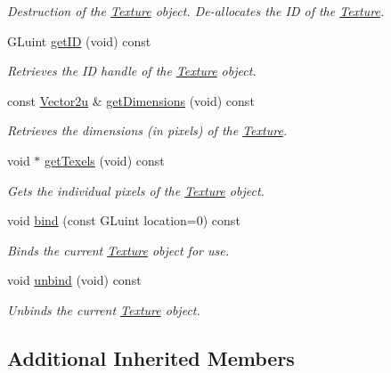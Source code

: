 \begin{DoxyCompactItemize}
\begin{DoxyCompactList}\small\item\em Destruction of the \hyperlink{classsparky_1_1_texture}{Texture} object. De-\/allocates the ID of the \hyperlink{classsparky_1_1_texture}{Texture}. \end{DoxyCompactList}\item 
G\+Luint \hyperlink{classsparky_1_1_texture_a61c9215efaf828f83a6ea6c58eedd65f}{get\+ID} (void) const 
\begin{DoxyCompactList}\small\item\em Retrieves the ID handle of the \hyperlink{classsparky_1_1_texture}{Texture} object. \end{DoxyCompactList}\item 
const \hyperlink{classsparky_1_1_vector2}{Vector2u} \& \hyperlink{classsparky_1_1_texture_a177155783d2f535828f54f7c0f9a8bf7}{get\+Dimensions} (void) const 
\begin{DoxyCompactList}\small\item\em Retrieves the dimensions (in pixels) of the \hyperlink{classsparky_1_1_texture}{Texture}. \end{DoxyCompactList}\item 
void $\ast$ \hyperlink{classsparky_1_1_texture_a10bfee7c9cf688039d8859a58084ee2b}{get\+Texels} (void) const 
\begin{DoxyCompactList}\small\item\em Gets the individual pixels of the \hyperlink{classsparky_1_1_texture}{Texture} object. \end{DoxyCompactList}\item 
void \hyperlink{classsparky_1_1_texture_ad4f4e218984e8f1a19c475c51294162c}{bind} (const G\+Luint location=0) const 
\begin{DoxyCompactList}\small\item\em Binds the current \hyperlink{classsparky_1_1_texture}{Texture} object for use. \end{DoxyCompactList}\item 
void \hyperlink{classsparky_1_1_texture_a1f3f2667c20ca1fcd99e5d88430cd4a1}{unbind} (void) const 
\begin{DoxyCompactList}\small\item\em Unbinds the current \hyperlink{classsparky_1_1_texture}{Texture} object. \end{DoxyCompactList}\end{DoxyCompactItemize}
\subsection*{Additional Inherited Members}



